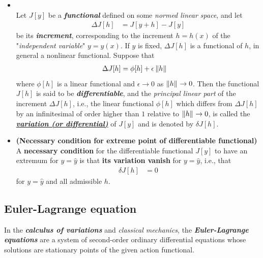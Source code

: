 \documentclass[11pt]{article}
\begin{document}
\begin{itemize}
\item \begin{definition} \citep{gelfand2000calculus}\\
Let $J[y]$ be a \emph{\textbf{functional}} defined on some \emph{normed linear space}, and let
\begin{align*}
\Delta J[h] &= J[y + h] - J[y]
\end{align*} be its \emph{\textbf{increment}}, corresponding to the increment $h = h(x)$ of the "\emph{independent variable}" $y = y(x)$.  If $y$ is fixed, $\Delta J[h]$ is a functional of $h$, in general a nonlinear functional. Suppose that
\begin{align*}
\Delta J[h] &= \phi[h] + \epsilon\left\|h\right\|_{}
\end{align*}
where $\phi[h]$ is a linear functional and $\epsilon\rightarrow 0$ as $\left\|h\right\|_{} \rightarrow 0$. Then the functional
$J[h]$ is said to be \emph{\textbf{differentiable}}, and the \emph{principal linear part} of the increment $\Delta J[h]$, i.e., the linear functional $\phi[h]$ which differs from $\Delta J[h]$ by an infinitesimal of order higher than $1$ relative to $\left\|h\right\|_{} \rightarrow 0$, is called the \underline{\emph{\textbf{variation (or differential)}}} of $J[y]$ and is denoted by $\delta J[h]$.
\end{definition}

\item \begin{theorem} \textbf{(Necessary condition for extreme point of differentiable functional)}  \citep{gelfand2000calculus}\\
A \textbf{necessary condition} for the differentiable functional $J[y]$ to have an extremum for $y = \hat{y}$ is that \textbf{its variation vanish} for $y = \hat{y}$,
i.e., that
\begin{align}
\delta J[h] &= 0 \label{eqn: cal_var_necessary_cond_extreme}
\end{align} for $y = \hat{y}$ and all admissible $h$.
\end{theorem}
\end{itemize}

\subsection{Euler-Lagrange equation}
In the \emph{\textbf{calculus of variations}} \citep{gelfand2000calculus} and \emph{classical mechanics}, the \emph{\textbf{Euler-Lagrange equations}} are a system of second-order ordinary differential equations whose solutions are stationary points of the given action functional. 
\end{document}

